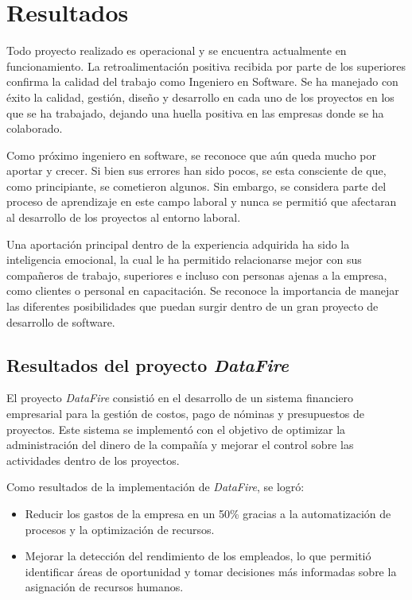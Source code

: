 \documentclass[protocolo.tex]{subfiles}
\begin{document}
\section{Resultados}
Todo proyecto realizado es operacional y se encuentra actualmente en funcionamiento. La retroalimentación positiva recibida por parte de los superiores confirma la calidad del trabajo como Ingeniero en Software. Se ha manejado con éxito la calidad, gestión, diseño y desarrollo en cada uno de los proyectos en los que se ha trabajado, dejando una huella positiva en las empresas donde se ha colaborado.\vspace{4mm}

Como próximo ingeniero en software, se reconoce que aún queda mucho por aportar y crecer. Si bien sus errores han sido pocos, se esta consciente de que, como principiante, se cometieron algunos.  Sin embargo, se considera parte del proceso de aprendizaje en este campo laboral y nunca se permitió que afectaran al desarrollo de los proyectos al entorno laboral.\vspace{4mm}

Una aportación principal dentro de la experiencia adquirida ha sido la inteligencia emocional, la cual le ha permitido relacionarse mejor con sus compañeros de trabajo, superiores e incluso con personas ajenas a la empresa, como clientes o personal en capacitación. Se reconoce la importancia de manejar las diferentes posibilidades que puedan surgir dentro de un gran proyecto de desarrollo de software.

\subsection{Resultados del proyecto \textit{DataFire}}

El proyecto \textit{DataFire} consistió en el desarrollo de un sistema financiero empresarial para la gestión de costos, pago de nóminas y presupuestos de proyectos. Este sistema se implementó con el objetivo de optimizar la administración del dinero de la compañía y mejorar el control sobre las actividades dentro de los proyectos.\vspace{4mm}

Como resultados de la implementación de \textit{DataFire}, se logró:

\begin{itemize}
\item Reducir los gastos de la empresa en un 50\% gracias a la automatización de procesos y la optimización de recursos.
\item Mejorar la detección del rendimiento de los empleados, lo que permitió identificar áreas de oportunidad y tomar decisiones más informadas sobre la asignación de recursos humanos.
\end{itemize}
\end{document}
